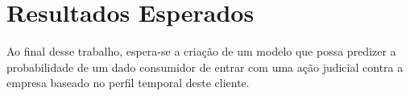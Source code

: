 \documentclass[../main.tex]{subfiles}
\begin{document}
\chapter{Resultados Esperados}
Ao final desse trabalho, espera-se a criação de um modelo que possa predizer a probabilidade de um dado consumidor de entrar com uma ação judicial contra a empresa baseado no perfil temporal deste cliente.  
\end{document}
